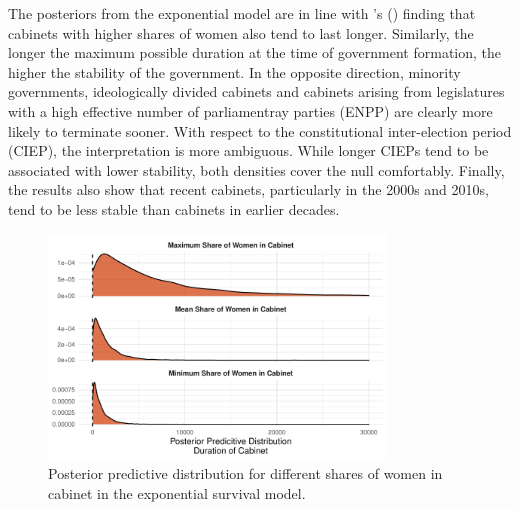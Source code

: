\documentclass[11pt]{article}
\newcommand\possecite[1]{\citeauthor{#1}'s (\citeyear{#1})}
\newcommand\minp[1]{\begin{minipage}{0.8\textwidth} #1 \end{minipage}}
\begin{document}
The posteriors from the exponential model are in line with \possecite{KK20} finding that cabinets with higher shares of women also tend to last longer. Similarly, the longer the maximum possible duration at the time of government formation, the higher the stability of the government. In the opposite direction, minority governments, ideologically divided cabinets and cabinets arising from legislatures with a high effective number of parliamentray parties (ENPP) are clearly more likely to terminate sooner. With respect to the constitutional inter-election period (CIEP), the interpretation is more ambiguous. While longer CIEPs tend to be associated with lower stability, both densities cover the null comfortably. Finally, the results also show that recent cabinets, particularly in the 2000s and 2010s, tend to be less stable than cabinets in earlier decades. 

\begin{figure}[!ht]
    \centering
    \minp{\caption{Posterior predictive distribution for different shares of women in cabinet in the exponential survival model.} \label{fig:exp_posteriorpredict}}
    \includegraphics[width = 0.8\textwidth]{figures/fig3_exp_posteriorpredict.pdf}
\end{figure}
\end{document}
